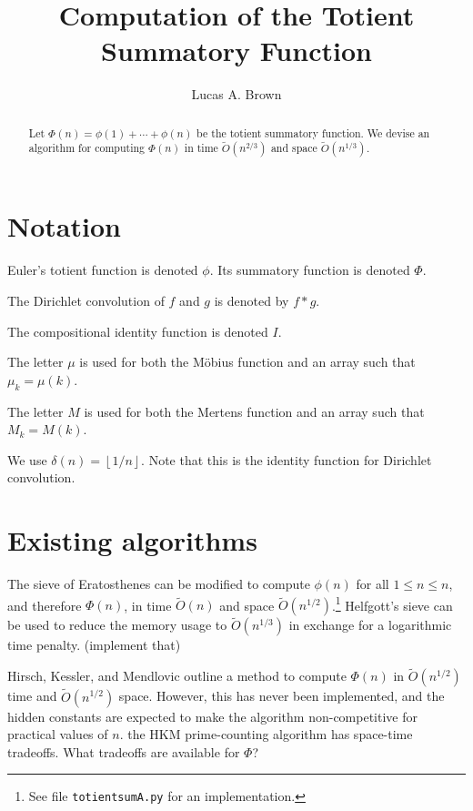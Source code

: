 \documentclass[12pt]{article}
\title{Computation of the Totient Summatory Function}
\author{Lucas A. Brown}
\date{\currentdatetime}
\newcommand{\floor}[1]{{\left\lfloor #1 \right\rfloor}}
\begin{document}
\maketitle %

\begin{abstract}
Let $\Phi(n) = \phi(1) + \cdots + \phi(n)$ be the totient summatory function.  We devise an algorithm for computing $\Phi(n)$ in time $\widetilde{O}(n^{2/3})$ and space $\widetilde{O}(n^{1/3})$.
\end{abstract}

\section{Notation}

Euler's totient function is denoted $\phi$.  Its summatory function is denoted $\Phi$.

The Dirichlet convolution of $f$ and $g$ is denoted by $f*g$.

The compositional identity function is denoted $I$.

The letter $\mu$ is used for both the M\"{o}bius function and an array such that $\mu_k = \mu(k)$.

The letter $M$ is used for both the Mertens function and an array such that $M_k = M(k)$.

We use $\delta(n) = \floor{1/n}$.  Note that this is the identity function for Dirichlet convolution.

\section{Existing algorithms}

The sieve of Eratosthenes can be modified to compute $\phi(n)$ for all $1 \leq n \leq n$, and therefore $\Phi(n)$, in time $\widetilde{O}(n)$ and space $\widetilde{O}(n^{1/2})$.\footnote{See file \texttt{totientsumA.py} for an implementation.}  Helfgott's sieve \cite{Helfgott2020} can be used to reduce the memory usage to $\widetilde{O}(n^{1/3})$ in exchange for a logarithmic time penalty.  (\todo implement that)

Hirsch, Kessler, and Mendlovic outline \cite[\S5.6]{HKM2024} a method to compute $\Phi(n)$ in $\widetilde{O}(n^{1/2})$ time and $\widetilde{O}(n^{1/2})$ space.  However, this has never been implemented, and the hidden constants are expected to make the algorithm non-competitive for practical values of $n$.  \todo the HKM prime-counting algorithm has space-time tradeoffs.  What tradeoffs are available for $\Phi$?
\end{document}
